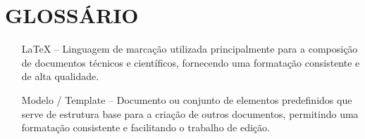 \chapter*{GLOSSÁRIO}

\begin{itemize}[]
\item[LaTeX] -- Linguagem de marcação utilizada principalmente para a composição de documentos técnicos e científicos, fornecendo uma formatação consistente e de alta qualidade.

\item[Modelo / Template] -- Documento ou conjunto de elementos predefinidos que serve de estrutura base para a criação de outros documentos, permitindo uma formatação consistente e facilitando o trabalho de edição.
\end{itemize}
